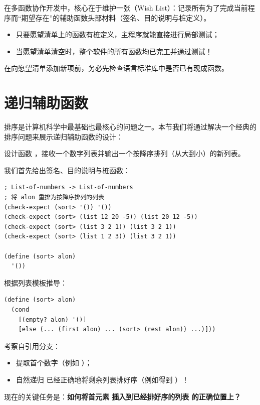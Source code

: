 \begin{notebox}
在多函数协作开发中，核心在于维护一张（Wish List）：记录所有为了完成当前程序而“期望存在”的辅助函数头部材料（签名、目的说明与桩定义）。
\begin{itemize}
  \item 只要愿望清单上的函数有桩定义，主程序就能直接进行局部测试；
  \item 当愿望清单清空时，整个软件的所有函数均已完工并通过测试！
\end{itemize}
在向愿望清单添加新项前，务必先检查语言标准库中是否已有现成函数。
\end{notebox}

\section{递归辅助函数}
\label{sec:ch11_auxiliary_functions_recur}

排序是计算机科学中最基础也最核心的问题之一。本节我们将通过解决一个经典的排序问题来展示递归辅助函数的设计：

\begin{notebox}[例题：实数列表降序排序]
设计函数 ，接收一个数字列表并输出一个按降序排列（从大到小）的新列表。
\end{notebox}

我们首先给出签名、目的说明与桩函数：
\begin{lstlisting}[language=BSL]
; List-of-numbers -> List-of-numbers
; 将 alon 重排为按降序排列的列表
(check-expect (sort> '()) '())
(check-expect (sort> (list 12 20 -5)) (list 20 12 -5))
(check-expect (sort> (list 3 2 1)) (list 3 2 1))
(check-expect (sort> (list 1 2 3)) (list 3 2 1))

(define (sort> alon)
  '())
\end{lstlisting}

根据列表模板推导：
\begin{lstlisting}[language=BSL]
(define (sort> alon)
  (cond
    [(empty? alon) '()]
    [else (... (first alon) ... (sort> (rest alon)) ...)]))
\end{lstlisting}

考察自引用分支：
\begin{itemize}
  \item {} 提取首个数字（例如 ）；
  \item 自然递归  已经正确地将剩余列表排好序（例如得到 ）！
\end{itemize}
现在的关键任务是：\textbf{如何将首元素  插入到已经排好序的列表  的正确位置上？}

